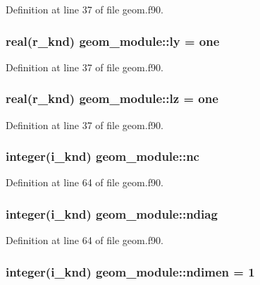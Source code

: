 Definition at line 37 of file geom.\-f90.

\hypertarget{classgeom__module_adc5d5005b562bb94578c33b5bcde0012}{
\subsubsection[{ly}]{\setlength{\rightskip}{0pt plus 5cm}real(r\-\_\-knd) geom\-\_\-module\-::ly = one}}\label{classgeom__module_adc5d5005b562bb94578c33b5bcde0012}


Definition at line 37 of file geom.\-f90.

\hypertarget{classgeom__module_aba080d6dd2b57ad40676a7331daaa824}{
\subsubsection[{lz}]{\setlength{\rightskip}{0pt plus 5cm}real(r\-\_\-knd) geom\-\_\-module\-::lz = one}}\label{classgeom__module_aba080d6dd2b57ad40676a7331daaa824}


Definition at line 37 of file geom.\-f90.

\hypertarget{classgeom__module_af92dc09eacd9c240bd51ea2792a13820}{
\subsubsection[{nc}]{\setlength{\rightskip}{0pt plus 5cm}integer(i\-\_\-knd) geom\-\_\-module\-::nc}}\label{classgeom__module_af92dc09eacd9c240bd51ea2792a13820}


Definition at line 64 of file geom.\-f90.

\hypertarget{classgeom__module_af0fed67c5ea2d50ee5063a4c83f43f00}{
\subsubsection[{ndiag}]{\setlength{\rightskip}{0pt plus 5cm}integer(i\-\_\-knd) geom\-\_\-module\-::ndiag}}\label{classgeom__module_af0fed67c5ea2d50ee5063a4c83f43f00}


Definition at line 64 of file geom.\-f90.

\hypertarget{classgeom__module_a764bf4ab4dc187512c803d73505e6b57}{
\subsubsection[{ndimen}]{\setlength{\rightskip}{0pt plus 5cm}integer(i\-\_\-knd) geom\-\_\-module\-::ndimen = 1}}\label{classgeom__module_a764bf4ab4dc187512c803d73505e6b57}


